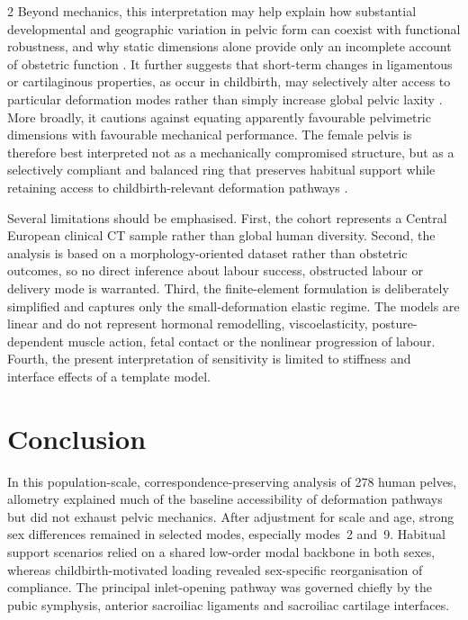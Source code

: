 \documentclass[openacc]{rsproca_new}
\begin{document}
\begin{multicols}{2}
Beyond mechanics, this interpretation may help explain how substantial developmental and geographic variation in pelvic form can coexist with functional robustness, and why static dimensions alone provide only an incomplete account of obstetric function \cite{BettiManica2018,Auerbach2018,VerbruggenNowlan2017,Novak2020,KurkiDecrausaz2015}. It further suggests that short-term changes in ligamentous or cartilaginous properties, as occur in childbirth, may selectively alter access to particular deformation modes rather than simply increase global pelvic laxity \cite{Vleeming2012,Kiapour2019,Stolarczyk2021}. More broadly, it cautions against equating apparently favourable pelvimetric dimensions with favourable mechanical performance. The female pelvis is therefore best interpreted not as a mechanically compromised structure, but as a selectively compliant and balanced ring that preserves habitual support while retaining access to childbirth-relevant deformation pathways \cite{Pavlicev2020,Haeusler2021,Grunstra2023,Warrener2015}.


Several limitations should be emphasised. First, the cohort represents a Central European clinical CT sample rather than global human diversity. Second, the analysis is based on a morphology-oriented dataset rather than obstetric outcomes, so no direct inference about labour success, obstructed labour or delivery mode is warranted. Third, the finite-element formulation is deliberately simplified and captures only the small-deformation elastic regime. The models are linear and do not represent hormonal remodelling, viscoelasticity, posture-dependent muscle action, fetal contact or the nonlinear progression of labour. Fourth, the present interpretation of sensitivity is limited to stiffness and interface effects of a template model.

\section{Conclusion}

In this population-scale, correspondence-preserving analysis of 278 human pelves, allometry explained much of the baseline accessibility of deformation pathways but did not exhaust pelvic mechanics. After adjustment for scale and age, strong sex differences remained in selected modes, especially modes~2 and~9. Habitual support scenarios relied on a shared low-order modal backbone in both sexes, whereas childbirth-motivated loading revealed sex-specific reorganisation of compliance. The principal inlet-opening pathway was governed chiefly by the pubic symphysis, anterior sacroiliac ligaments and sacroiliac cartilage interfaces.


\end{multicols}
\end{document}
